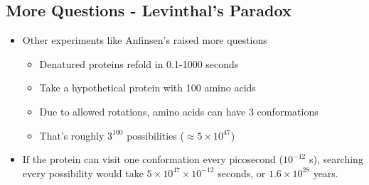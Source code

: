 \documentclass[10pt]{article}
\begin{document}
\subsection*{More Questions - Levinthal's Paradox}
\begin{itemize}
    \item Other experiments like Anfinsen's raised more questions
    \begin{itemize}
        \item Denatured proteins refold in 0.1-1000 seconds
        \item Take a hypothetical protein with 100 amino acids
        \item Due to allowed rotations, amino acids can have 3 conformations
        \item That's roughly $3^{100}$ possibilities ($\approx 5 \times 10^{47}$)
    \end{itemize}
    \item If the protein can visit one conformation every picosecond ($10^{-12}$ s), searching every possibility would take $5 \times 10^{47} \times 10^{-12}$ seconds, or $1.6 \times 10^{28}$ years.
\end{itemize}
\end{document}
